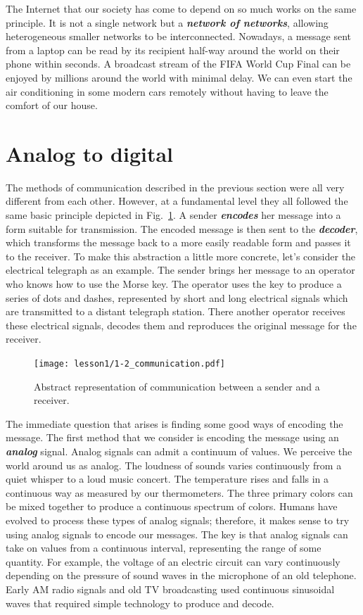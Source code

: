 The Internet that our society has come to depend on so much works on the same principle.
It is not a single network but a \textit{\textbf{network of networks}}, allowing heterogeneous smaller networks to be interconnected.
Nowadays, a message sent from a laptop can be read by its recipient half-way around the world on their phone within seconds.
A broadcast stream of the FIFA World Cup Final can be enjoyed by millions around the world with minimal delay.
We can even start the air conditioning in some modern cars remotely without having to leave the comfort of our house.


\section{Analog to digital}


The methods of communication described in the previous section were all very different from each other.
However, at a fundamental level they all followed the same basic principle depicted in Fig.~\ref{fig:1-2_communication}.
A sender \textit{\textbf{encodes}} her message into a form suitable for transmission.
The encoded message is then sent to the \textit{\textbf{decoder}}, which transforms the message back to a more easily readable form and passes it to the receiver.
To make this abstraction a little more concrete, let's consider the electrical telegraph as an example.
The sender brings her message to an operator who knows how to use the Morse key.
The operator uses the key to produce a series of dots and dashes, represented by short and long electrical signals which are transmitted to a distant telegraph station.
There another operator receives these electrical signals, decodes them and reproduces the original message for the receiver.

\begin{figure}[t]
    \centering
    \texttt{[image: lesson1/1-2\_communication.pdf]}
    \caption[Abstraction of communication.]{Abstract representation of communication between a sender and a receiver.}
    \label{fig:1-2_communication}
\end{figure}

The immediate question that arises is finding some good ways of encoding the message.
The first method that we consider is encoding the message using an \textit{\textbf{analog}} signal.
Analog signals can admit a continuum of values.
We perceive the world around us as analog.
The loudness of sounds varies continuously from a quiet whisper to a loud music concert.
The temperature rises and falls in a continuous way as measured by our thermometers.
The three primary colors can be mixed together to produce a continuous spectrum of colors.
Humans have evolved to process these types of analog signals; therefore, it makes sense to try using analog signals to encode our messages.
The key is that analog signals can take on values from a continuous interval, representing the range of some quantity.
For example, the voltage of an electric circuit can vary continuously depending on the pressure of sound waves in the microphone of an old telephone.
Early AM radio signals and old TV broadcasting used continuous sinusoidal waves that required simple technology to produce and decode.

